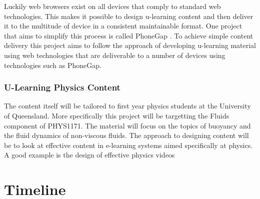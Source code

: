 \documentclass[12pt,a4paper]{article}  %
\begin{document}
Luckily web browsers exist on all devices that comply to standard web
technologies. This makes it possible to design u-learning content and
then deliver it to the multitude of device in a consistent
maintainable format. One project that aims to simplify this process is
called PhoneGap \cite{phonegap}. To achieve simple content delivery
this project aims to follow the approach of developing u-learning
material using web technologies that are deliverable to a number of
devices using technologies such as PhoneGap.

\subsubsection*{U-Learning Physics Content}

The content itself will be tailored to first year physics students at
the University of Queensland. More specifically this project will be
targetting the Fluids component of PHYS1171. The material will focus
on the topics of buoyancy and the fluid dynamics of non-viscous
fluids. The approach to designing content will be to look at effective
content in e-learning systems aimed specifically at physics. A good
example is the design of effective physics videos \cite{vid}


\section*{Timeline}



\end{document}
